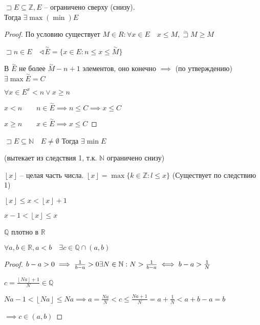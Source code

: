 \documentclass{book}
\newcommand\N{\ensuremath{\mathbb{N}}}
\newcommand\R{\ensuremath{\mathbb{R}}}
\newcommand\Z{\ensuremath{\mathbb{Z}}}
\renewcommand\O{\ensuremath{\emptyset}}
\newcommand\Q{\ensuremath{\mathbb{Q}}}
\theoremstyle{definition}
\begin{document}
    \begin{corollary}
        $\sqsupset E \subseteq \Z , E $ -- ограничено сверху (снизу). \\Тогда $\exists \max(\min) E$
    \end{corollary}
    \begin{proof}
        По условию существует $M\in R: \forall x\in E\quad x\leqslant M, \overset{\sim }\sqsupset M \geqslant M$
        
        $\sqsupset n\in E\quad \sphericalangle \overset{\sim }E = \{x\in E: n\leqslant x\leqslant \overset{\sim }M\}$

        В $\overset{\sim }E$ не более $\overset{\sim }M - n+1$ элементов, оно конечно $\implies $ (по утверждению) $\exists \max \overset{\sim }E = C$

        $\forall x\in E^ x<n\vee x\geqslant n\qquad$

        $x<n\qquad n\in \overset{\sim }E \implies n\leqslant C \implies x\leqslant C$

        $x\geqslant n\qquad x\in \overset{\sim }E \implies x\leqslant C$
    \end{proof}
    \begin{corollary}
        $\sqsupset E\subseteq \N \quad E\neq \O $ Тогда $\exists \min E$

        (вытекает из следствия 1, т.к. $\N $ ограничено снизу)
    \end{corollary}

    $\left\lfloor x \right\rfloor$ -- целая часть числа. $\left\lfloor x \right\rfloor = \max\{k\in \Z :l\leqslant x\}$ (Существует по следствию 1)

    $\left\lfloor x \right\rfloor\leqslant x< \left\lfloor x \right\rfloor +1    $

    $x-1< \left\lfloor x \right\rfloor \leqslant x$

    \begin{statement}
        $\Q$ плотно в $\R$

        $\forall a, b\in \R, a<b\quad \exists c\in \Q\cap (a,b)$
    \end{statement}
    \begin{proof}
        $b-a>0 \implies \frac{1}{b-a}>0\quad\newline \exists N\in \N: N>\frac{1}{b-a} \iff  b-a>\frac{1}{N}$
        
        $c = \frac{\left\lfloor Na \right\rfloor+1}{N} \in \Q$

        $Na-1<\left\lfloor Na \right\rfloor\leqslant Na \implies  a = \frac{Na}{N}<c\leqslant \frac{Na+1}{N} = a + \frac{1}{N}<a+b-a = b$

        $\implies c\in (a,b)$


    \end{proof}
\end{document}
